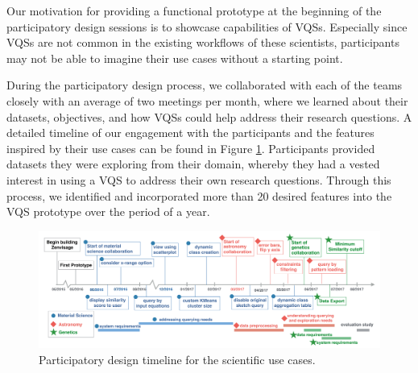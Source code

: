 Our motivation for providing a functional prototype at the beginning of the participatory design sessions is to showcase capabilities of VQSs. Especially since VQSs are not common in the existing workflows of these scientists, participants may not be able to imagine their use cases without a starting point.
\par During the participatory design process, we collaborated with each of the teams closely with an average of two meetings per month, where we learned about their datasets, objectives, and how VQSs could help address their research questions. A detailed timeline of our engagement with the participants and the features inspired by their use cases can be found in Figure \ref{timeline}. Participants provided datasets they were exploring from their domain, whereby they had a vested interest in using a VQS to address their own research questions. Through this process, we identified and incorporated more than 20 desired features into the VQS prototype over the period of a year.
\begin{figure}[!ht]
	\centering
	\captionsetup{justification=centering,margin=2cm}
	\vspace{-10pt}
	\includegraphics[width=6in]{figures/timeline_new.pdf}
	\vspace{-6pt}\caption{Participatory design timeline for the scientific use cases.}
	\label{timeline}
	\vspace{-10pt}
\end{figure}
